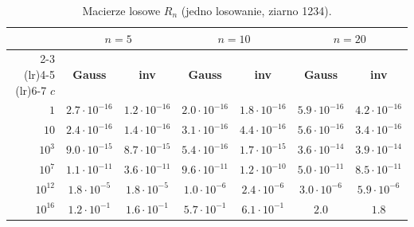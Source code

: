 \documentclass[11pt,a4paper]{article}
\begin{document}
\begin{table}[H]
\centering
\footnotesize
\setlength{\tabcolsep}{4pt}
\caption{Macierze losowe $R_n$ (jedno losowanie, ziarno 1234).}
\begin{tabular}{rcccccc}
\toprule
 & \multicolumn{2}{c}{$n = 5$} & \multicolumn{2}{c}{$n = 10$} & \multicolumn{2}{c}{$n = 20$} \\
\cmidrule(lr){2-3} \cmidrule(lr){4-5} \cmidrule(lr){6-7}
$c$ & \textbf{Gauss} & \textbf{inv} & \textbf{Gauss} & \textbf{inv} & \textbf{Gauss} & \textbf{inv} \\
\midrule
$1$ & $2.7 \cdot 10^{-16}$ & $1.2 \cdot 10^{-16}$ & $2.0 \cdot 10^{-16}$ & $1.8 \cdot 10^{-16}$ & $5.9 \cdot 10^{-16}$ & $4.2 \cdot 10^{-16}$ \\
$10$ & $2.4 \cdot 10^{-16}$ & $1.4 \cdot 10^{-16}$ & $3.1 \cdot 10^{-16}$ & $4.4 \cdot 10^{-16}$ & $5.6 \cdot 10^{-16}$ & $3.4 \cdot 10^{-16}$ \\
$10^{3}$ & $9.0 \cdot 10^{-15}$ & $8.7 \cdot 10^{-15}$ & $5.4 \cdot 10^{-16}$ & $1.7 \cdot 10^{-15}$ & $3.6 \cdot 10^{-14}$ & $3.9 \cdot 10^{-14}$ \\
$10^{7}$ & $1.1 \cdot 10^{-11}$ & $3.6 \cdot 10^{-11}$ & $9.6 \cdot 10^{-11}$ & $1.2 \cdot 10^{-10}$ & $5.0 \cdot 10^{-11}$ & $8.5 \cdot 10^{-11}$ \\
$10^{12}$ & $1.8 \cdot 10^{-5}$ & $1.8 \cdot 10^{-5}$ & $1.0 \cdot 10^{-6}$ & $2.4 \cdot 10^{-6}$ & $3.0 \cdot 10^{-6}$ & $5.9 \cdot 10^{-6}$ \\
$10^{16}$ & $1.2 \cdot 10^{-1}$ & $1.6 \cdot 10^{-1}$ & $5.7 \cdot 10^{-1}$ & $6.1 \cdot 10^{-1}$ & $2.0$ & $1.8$ \\
\bottomrule
\end{tabular}
\end{table}
\end{document}
